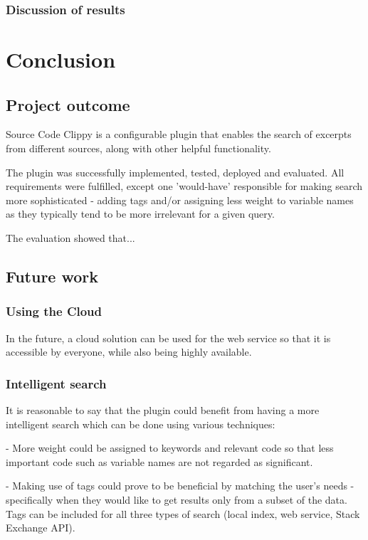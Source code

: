 \documentclass{l4proj}
\begin{document}
\subsection{Discussion of results}

\chapter{Conclusion}

\section{Project outcome}

Source Code Clippy is a configurable plugin that enables the search of excerpts from different sources, along with other helpful functionality.

The plugin was successfully implemented, tested, deployed and evaluated. All requirements were fulfilled, except one 'would-have' responsible for making search more sophisticated - adding tags and/or assigning less weight to variable names as they typically tend to be more irrelevant for a given query.

The evaluation showed that...

\section{Future work}

\subsection{Using the Cloud}
In the future, a cloud solution can be used for the web service so that it is accessible by everyone, while also being highly available. 

\subsection{Intelligent search}
It is reasonable to say that the plugin could benefit from having a more intelligent search which can be done using various techniques:

- More weight could be assigned to keywords and relevant code so that less important code such as variable names are not regarded as significant. 

- Making use of tags could prove to be beneficial by matching the user's needs - specifically when they would like to get results only from a subset of the data. Tags can be included for all three types of search (local index, web service, Stack Exchange API).
\end{document}
